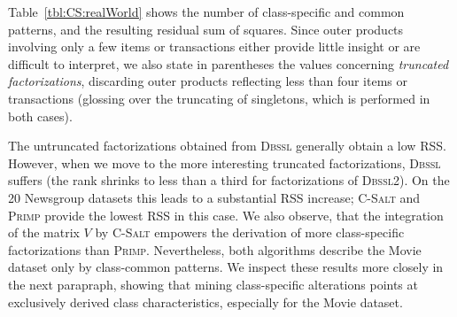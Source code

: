 Table~\ref{tbl:CS:realWorld} shows the number of class-specific and common patterns, and the resulting residual sum of squares. Since outer products involving only a few items or transactions either provide little insight or are difficult to interpret, we also state in parentheses the values concerning \textit{truncated factorizations}, discarding outer products reflecting less than four items or transactions (glossing over the truncating of singletons, which is performed in both cases).

The untruncated factorizations obtained from \textsc{Dbssl} generally obtain a low RSS. However, when we move to the more interesting truncated factorizations, \textsc{Dbssl} suffers (the rank shrinks to less than a third for factorizations of \textsc{Dbssl2}). On the 20 Newsgroup datasets this leads to a substantial RSS increase; \textsc{C-Salt} and \textsc{Primp} provide the lowest RSS in this case. We also observe, that the integration of the matrix $V$ by \textsc{C-Salt} empowers the derivation of more class-specific factorizations than \textsc{Primp}. Nevertheless, both algorithms describe the Movie dataset only by class-common patterns. We inspect these results more closely in the next parapraph, showing that mining class-specific alterations points at exclusively derived class characteristics, especially for the Movie dataset.  
%
